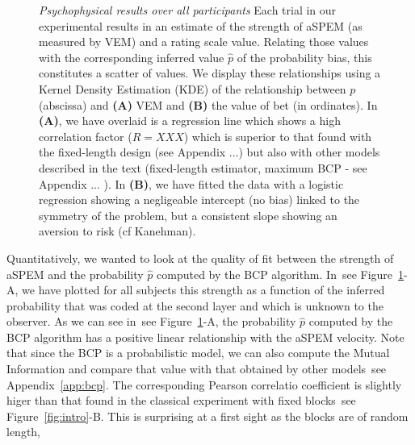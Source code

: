 \documentclass[profile,final,english, draft]{article}%
\newcommand{\seeFig}[1]{see Figure~\ref{fig:#1}}
\newcommand{\seeApp}[1]{see Appendix~\ref{app:#1}}
\begin{document}
\begin{figure}%
\begin{center}
\end{center}
\caption{\emph{Psychophysical results over all participants}
Each trial in our experimental results in an estimate of
the strength of aSPEM (as measured by VEM)
and a rating scale value.
Relating those values with the corresponding inferred value $\hat{p}$
of the probability bias,
this constitutes a scatter of values.
We display these relationships using a
Kernel Density Estimation (KDE) of the relationship between $p$ (abscissa)
and \textbf{(A)} VEM and \textbf{(B)} the value of bet (in ordinates).
In \textbf{(A)}, we have overlaid is a regression line which shows
a high correlation factor ($R=XXX$) which is superior to that found
with the fixed-length design (see Appendix ...)
but also with other models described in the text
(fixed-length estimator, maximum BCP - see Appendix ... ).
In \textbf{(B)}, we have fitted the data with a logistic regression
showing a negligeable intercept (no bias) linked to the symmetry
of the problem, but a consistent slope showing an aversion to risk
(cf Kanehman).
}
\label{fig:results_psycho}
\end{figure}
Quantitatively, we wanted to look at the quality of fit
between the strength of aSPEM and
the probability $\hat{p}$ computed by the BCP algorithm.
In~\seeFig{results_psycho}-A, we have plotted for all subjects
this strength as a function of the inferred probability
that was coded at the second layer and which is unknown to the observer.
As we can see in~\seeFig{results_psycho}-A,
the probability $\hat{p}$ computed by the BCP algorithm
has a positive linear relationship with the aSPEM velocity.
Note that since the BCP is a probabilistic model,
we can also compute the Mutual Information and
compare that value with that obtained by other models~\seeApp{bcp}.
The corresponding Pearson correlatio coefficient
is slightly higer than that found in
the classical experiment with fixed blocks~\seeFig{intro}-B.
This is surprising at a first sight as the blocks are of random length,
\end{document}
